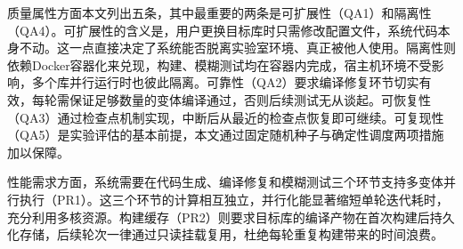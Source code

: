 \begin{table}[H]
    \centering
    \caption{非功能性需求列表}
    \label{tab:nonfunctional-req}
\end{table}

质量属性方面本文列出五条，其中最重要的两条是可扩展性（QA1）和隔离性（QA4）。可扩展性的含义是，用户更换目标库时只需修改配置文件，系统代码本身不动。这一点直接决定了系统能否脱离实验室环境、真正被他人使用。隔离性则依赖Docker容器化来兑现，构建、模糊测试均在容器内完成，宿主机环境不受影响，多个库并行运行时也彼此隔离。可靠性（QA2）要求编译修复环节切实有效，每轮需保证足够数量的变体编译通过，否则后续测试无从谈起。可恢复性（QA3）通过检查点机制实现，中断后从最近的检查点恢复即可继续。可复现性（QA5）是实验评估的基本前提，本文通过固定随机种子与确定性调度两项措施加以保障。

性能需求方面，系统需要在代码生成、编译修复和模糊测试三个环节支持多变体并行执行（PR1）。这三个环节的计算相互独立，并行化能显著缩短单轮迭代耗时，充分利用多核资源。构建缓存（PR2）则要求目标库的编译产物在首次构建后持久化存储，后续轮次一律通过只读挂载复用，杜绝每轮重复构建带来的时间浪费。

